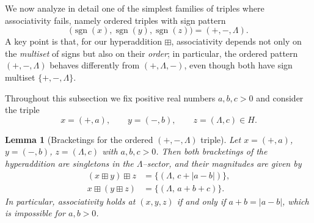 \documentclass[11pt]{amsart}
\numberwithin{equation}{section}
\newtheorem{lemma}[theorem]{Lemma}
\theoremstyle{definition}
\theoremstyle{remark}
\newcommand{\Hnum}{H}                      %
\newcommand{\op}{\boxplus}                 %
\begin{document}
We now analyze in detail one of the simplest families of triples where
associativity fails, namely ordered triples with sign pattern
\[
  \bigl(\operatorname{sgn}(x),\operatorname{sgn}(y),\operatorname{sgn}(z)\bigr)
  = (+,-,\Lambda).
\]
A key point is that, for our hyperaddition $\op$, associativity depends
not only on the \emph{multiset} of signs but also on their \emph{order};
in particular, the ordered pattern $(+,-,\Lambda)$ behaves differently
from $(+,\Lambda,-)$, even though both have sign multiset
$\{+,-,\Lambda\}$.

Throughout this subsection we fix positive real numbers $a,b,c>0$ and
consider the triple
\[
  x = (+,a),\qquad
  y = (-,b),\qquad
  z = (\Lambda,c)\in\Hnum.
\]

\begin{lemma}[Bracketings for the ordered $(+,-,\Lambda)$ triple]
\label{lem:assoc-bracketings}
Let $x=(+,a)$, $y=(-,b)$, $z=(\Lambda,c)$ with $a,b,c>0$.  Then both
bracketings of the hyperaddition are singletons in the $\Lambda$--sector,
and their magnitudes are given by
\begin{align*}
  (x\op y)\op z
  &= \{(\Lambda,\,c+|a-b|)\},\\[4pt]
  x\op(y\op z)
  &= \{(\Lambda,\,a+b+c)\}.
\end{align*}
In particular, associativity holds at $(x,y,z)$ if and only if
$a+b=|a-b|$, which is impossible for $a,b>0$.
\end{lemma}
\end{document}
